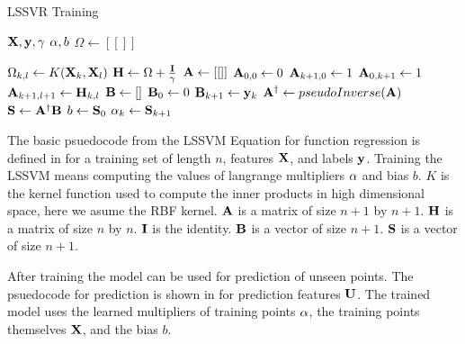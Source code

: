 \begin{algorithm}[H]
        \caption{LSSVR Training}\label{alg1:cap}
        \begin{algorithmic}[1]
                \Require $\vb{X}, \vb{y}, \gamma$
                \Ensure $\vb{\alpha}, b$
                \State $\Omega \gets [[]]$ 

                \State$\Omega_{k,l}\gets K(\vb{X}_k,\vb{X}_l)$
                \EndFor
                \EndFor
                \State $\vb{H} \gets \Omega + \frac{\vb{I}}{\gamma}$
                \State $\vb{A} \gets [[]]$ 
                \State $\vb{A}_{0,0} \gets 0$
                \State $\vb{A}_{k+1,0} \gets 1$
                \State $\vb{A}_{0,k+1} \gets 1$
                \EndFor
                \State $\vb{A}_{k+1,l+1} \gets \vb{H}_{k,l}$
                \EndFor
                \EndFor
                \State $\vb{B}\gets []$ 
                \State $\vb{B}_0 \gets 0$
                \State $\vb{B}_{k+1} \gets \vb{y}_{k}$
                \EndFor
                \State $\vb{A}^{\dagger} \gets pseudoInverse(\vb{A})$ 
                \State $\vb{S} \gets \vb{A}^{\dagger}\vb{B}$
                \State $b \gets \vb{S}_{0}$
                \State $\vb{\alpha}_{k} \gets \vb{S}_{k+1}$
                \EndFor
        \end{algorithmic}
\end{algorithm}

The basic psuedocode from the LSSVM Equation for function regression is defined in  for a training set of length $n$, features $\vb{X}$, and labels $\vb{y}$. Training the LSSVM means computing the values of langrange multipliers $\vb{\alpha}$ and bias $b$. $K$ is the kernel function used to compute the inner products in high dimensional space, here we asume the RBF kernel. $\vb{A}$ is a matrix of size $n+1$ by $n+1$. $\vb{H}$ is a matrix of size $n$ by $n$. $\vb{I}$ is the identity. $\vb{B}$ is a vector of size $n+1$. $\vb{S}$ is a vector of size $n+1$.

After training the model can be used for prediction of unseen points. The psuedocode for prediction is shown in  for prediction features $\vb{U}$. The trained model uses the learned multipliers of training points $\vb{\alpha}$, the training points themselves $\vb{X}$, and the bias $b$.

